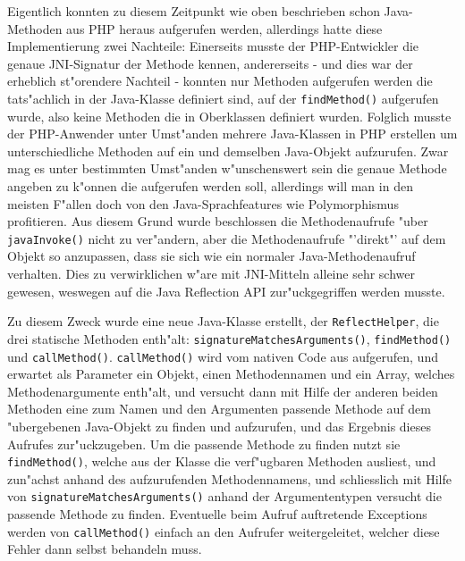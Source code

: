 Eigentlich konnten zu diesem Zeitpunkt wie oben beschrieben schon Java-Methoden aus PHP heraus aufgerufen werden, allerdings hatte
diese Implementierung zwei Nachteile: Einerseits musste der PHP-Entwickler die genaue JNI-Signatur der Methode kennen, andererseits -
und dies war der erheblich st"orendere Nachteil - konnten nur Methoden aufgerufen werden die tats"achlich in der Java-Klasse definiert
sind, auf der \texttt{findMethod()} aufgerufen wurde, also keine Methoden die in Oberklassen definiert wurden. Folglich musste der
PHP-Anwender unter Umst"anden mehrere Java-Klassen in PHP erstellen um unterschiedliche Methoden auf ein und demselben Java-Objekt
aufzurufen. Zwar mag es unter bestimmten Umst"anden w"unschenswert sein die genaue Methode angeben zu k"onnen die aufgerufen werden
soll, allerdings will man in den meisten F"allen doch von den Java-Sprachfeatures wie Polymorphismus profitieren. Aus diesem Grund
wurde beschlossen die Methodenaufrufe "uber \texttt{javaInvoke()} nicht zu ver"andern, aber die Methodenaufrufe "'direkt"' auf dem Objekt
so anzupassen, dass sie sich wie ein normaler Java-Methodenaufruf verhalten. Dies zu verwirklichen w"are mit JNI-Mitteln alleine
sehr schwer gewesen, weswegen auf die Java Reflection API zur"uckgegriffen werden musste.

Zu diesem Zweck wurde eine neue Java-Klasse erstellt, der \texttt{ReflectHelper}, die drei statische Methoden enth"alt:
\texttt{signatureMatchesArguments()}, \texttt{findMethod()} und \texttt{callMethod()}. 
\texttt{callMethod()} wird vom nativen Code aus aufgerufen, und erwartet als Parameter ein Objekt, einen Methodennamen und ein 
Array, welches Methodenargumente enth"alt, und versucht dann mit Hilfe der anderen beiden Methoden eine zum Namen und den Argumenten 
passende Methode auf dem "ubergebenen Java-Objekt zu finden und aufzurufen, und das Ergebnis dieses Aufrufes zur"uckzugeben.
Um die passende Methode zu finden nutzt sie \texttt{findMethod()}, welche aus der Klasse die verf"ugbaren Methoden ausliest, und 
zun"achst anhand des aufzurufenden Methodennamens, und schliesslich mit Hilfe von \texttt{signatureMatchesArguments()} anhand der
Argumententypen versucht die passende Methode zu finden. Eventuelle beim Aufruf auftretende Exceptions werden von \texttt{callMethod()}
einfach an den Aufrufer weitergeleitet, welcher diese Fehler dann selbst behandeln muss.

